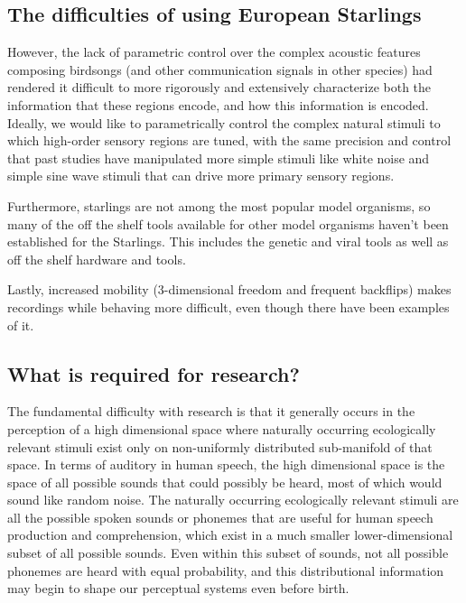\subsection{The difficulties of using European Starlings}

However, the lack of parametric control over the complex acoustic features composing birdsongs (and other communication signals in other species) had rendered it difficult to more rigorously and extensively characterize both the information that these regions encode, and how this information is encoded.  Ideally, we would like to parametrically control the complex natural stimuli to which high-order sensory regions are tuned, with the same precision and control that past studies have manipulated more simple stimuli like white noise and simple sine wave stimuli that can drive more primary sensory regions.

Furthermore, starlings are not among the most popular model organisms, so many of the off the shelf tools available for other model organisms haven't been established for the Starlings. This includes the genetic and viral tools as well as off the shelf hardware and tools.

Lastly, increased mobility (3-dimensional freedom and frequent backflips) makes recordings while behaving more difficult, even though there have been examples of it\cite{knudsen2013active,others}.

\subsection{What is required for \CP research?}

The fundamental difficulty with \CP research is that it generally occurs in the perception of a high dimensional space where naturally occurring ecologically relevant stimuli exist only on non-uniformly distributed sub-manifold of that space. In terms of auditory \CP in human speech, the high dimensional space is the space of all possible sounds that could possibly be heard, most of which would sound like random noise. The naturally occurring ecologically relevant stimuli are all the possible spoken sounds or phonemes that are useful for human speech production and comprehension, which exist in a much smaller lower-dimensional subset of all possible sounds. Even within this subset of sounds, not all possible phonemes are heard with equal probability, and this distributional information may begin to shape our perceptual systems even before birth.

